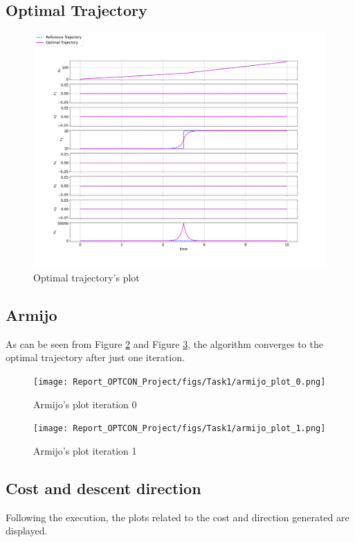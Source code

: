 \documentclass[a4paper,11pt,oneside]{book}
\begin{document}
\subsection{Optimal Trajectory}
\begin{figure}[h]
        \centering
        \includegraphics[scale=.32]{figs/Task1/opt_trajectory}
        \caption{Optimal trajectory's plot}
        \label{fig:enter-label}
\end{figure}
\newpage
\subsection{Armijo}
As can be seen from Figure \ref{fig:Armijo's plot iteration 0} and Figure \ref{fig:Armijo's plot iteration 1}, the algorithm converges to the optimal trajectory after just one iteration.

\begin{figure}[h]
    \centering
    \texttt{[image: Report\_OPTCON\_Project/figs/Task1/armijo\_plot\_0.png]}
    \caption{Armijo's plot iteration 0}
    \label{fig:Armijo's plot iteration 0}
\end{figure}
\begin{figure}[h]
    \centering
    \texttt{[image: Report\_OPTCON\_Project/figs/Task1/armijo\_plot\_1.png]}
    \caption{Armijo's plot iteration 1}
    \label{fig:Armijo's plot iteration 1}
\end{figure}
\newpage
\newpage

\subsection{Cost and descent direction}
Following the execution, the plots related to the cost and direction generated are displayed.
\end{document}
